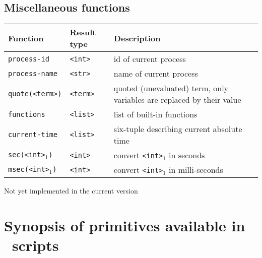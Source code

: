 \documentclass[a4,twoside,noweb]{article} %
\begin{document}
\subsection{Miscellaneous functions}

\begin{tabular}{|l|l|p{8cm}|} \hline
 Function				& Result type 	& Description \\ \hline
 {\tt process-id}			& {\tt  <int>}   & id of current process \\
 {\tt process-name}			& {\tt  <str>}   & name of current process\\
 {\tt quote(<term>)}			& {\tt  <term>}  & quoted (unevaluated) term,
							   only variables are replaced by their value \\
 {\tt functions}			& {\tt  <list>}  & list of built-in functions\\ \hline
 {\tt current-time}			& {\tt <list>}	 & six-tuple describing current absolute time\\
 {\tt sec(<int>$_1$)}			& {\tt <int>}	 & convert {\tt <int>$_1$} in seconds \\
 {\tt msec(<int>$_1$)}\dag		& {\tt <int>}	 & convert {\tt <int>$_1$} in milli-seconds\\ \hline
\end{tabular}

\vspace{\baselineskip}
\noindent \dag Not yet implemented in the current version
\newpage


\section{Synopsis of primitives available in \T\ scripts}
\end{document}
